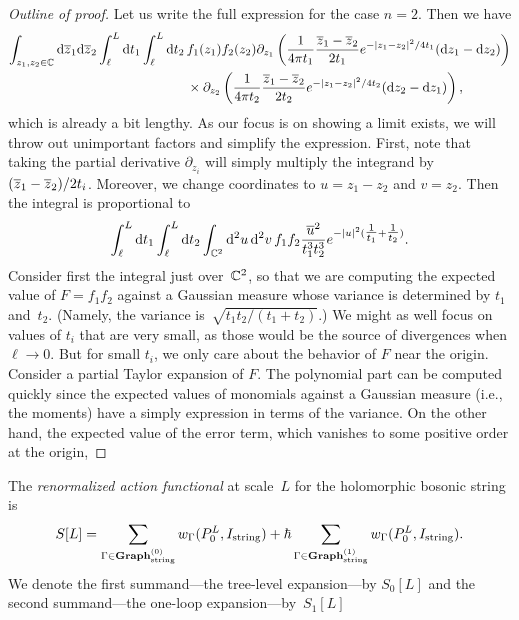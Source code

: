 \begin{proof}[Outline of proof]
Let us write the full expression for the case $n=2$.
Then we have
\begin{align*}
\int_{z_1,z_2 \in \mathbb C} {\rm d}\overline{z}_1{\rm d}\overline{z}_2 \int_{\ell}^L {\rm d} t_1 \int_{\ell}^L {\rm d} t_2\, 
& f_1(z_1)f_2(z_2) 
\partial_{z_1} \left(\frac{1}{4\pi t_1} \frac{\overline{z}_1 - \overline{z}_2}{2t_1} e^{-|z_1-z_2|^2/4t_1} ({\rm d} z_1 - {\rm d} z_2) \right)\\
& \times \partial_{z_2} \left(\frac{1}{4\pi t_2} \frac{\overline{z}_1 - \overline{z}_2}{2t_2} e^{-|z_1-z_2|^2/4t_2} ({\rm d} z_2 - {\rm d} z_1) \right),
\end{align*}
which is already a bit lengthy.
As our focus is on showing a limit exists, we will throw out unimportant factors and simplify the expression.
First, note that taking the partial derivative $\partial_{z_i}$ will simply multiply the integrand by $(\overline{z}_1 - \overline{z}_2)/2t_i$.
Moreover, we change coordinates to $u = z_1 - z_2$ and $v = z_2$. 
Then the integral is proportional to
\[
\int_{\ell}^L {\rm d} t_1 \int_{\ell}^L {\rm d} t_2\int_{\mathbb C^2} {\rm d}^2 u \, {\rm d}^2 v \, f_1 f_2 \frac{\overline{u}^2}{t_1^3 t_2^3} e^{-|u|^2(\tfrac{1}{t_1} + \tfrac{1}{t_2})}.
\]
Consider first the integral just over~$\mathbb C^2$,
so that we are computing the expected value of $F=f_1 f_2$ against a Gaussian measure 
whose variance is determined by $t_1$ and~$t_2$.
(Namely, the variance is~$\sqrt{t_1 t_2/(t_1+t_2)}$.)
We might as well focus on values of $t_i$ that are very small, as those would be the source of divergences when $\ell \to 0$.
But for small $t_i$, we only care about the behavior of $F$ near the origin.
Consider a partial Taylor expansion of $F$.
The polynomial part can be computed quickly since the expected values of monomials against a Gaussian measure (i.e., the moments) have a simply expression in terms of the variance.
On the other hand, the expected value of the error term, which vanishes to some positive order at the origin,
\end{proof}


\begin{dfn}
The {\em renormalized action functional} at scale~$L$ for the holomorphic bosonic string is
\[
S[L] = \sum_{\Gamma \in {\bf Graph}_{\rm string}^{(0)}} w_{\Gamma}(P_{0}^L,I_{\rm string}) + \hbar\sum_{\Gamma \in {\bf Graph}_{\rm string}^{(1)}} w_{\Gamma}(P_{0}^L,I_{\rm string}).
\]
We denote the first summand---the tree-level expansion---by $S_0[L]$ 
and the second summand---the one-loop expansion---by~$S_1[L]$
\end{dfn}

